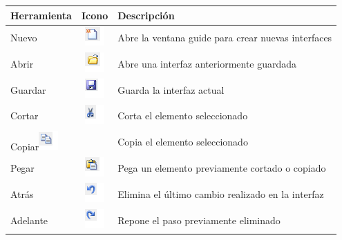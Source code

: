 \begin{table}[H]
\begin{center}
\resizebox{12cm}{!} {
\begin{tabular}{|l|c|l|}
\hline
Herramienta & Icono & Descripción \\
\hline \hline
Nuevo&\includegraphics{imagenes/iconosguide/nuevo.png} & Abre la ventana guide para crear nuevas interfaces \\ \hline
Abrir &\includegraphics{imagenes/iconosguide/abrir.png} & Abre una interfaz anteriormente guardada \\ \hline
Guardar &\includegraphics{imagenes/iconosguide/guardar.png} &Guarda la interfaz actual \\ \hline
Cortar&\includegraphics{imagenes/iconosguide/cortar.png}  &Corta el elemento seleccionado\\ \hline
Copiar\includegraphics{imagenes/iconosguide/copiar.png} & &Copia el elemento seleccionado\\ \hline
Pegar&\includegraphics{imagenes/iconosguide/pegar.png} &Pega un elemento previamente cortado o copiado  \\ \hline
Atrás&\includegraphics{imagenes/iconosguide/atras.png}  & Elimina el último cambio realizado en la interfaz\\ \hline
Adelante&\includegraphics{imagenes/iconosguide/adelante.png} &Repone el paso previamente eliminado \\ \hline

\end{tabular}}
\end{center}
\end{table}
